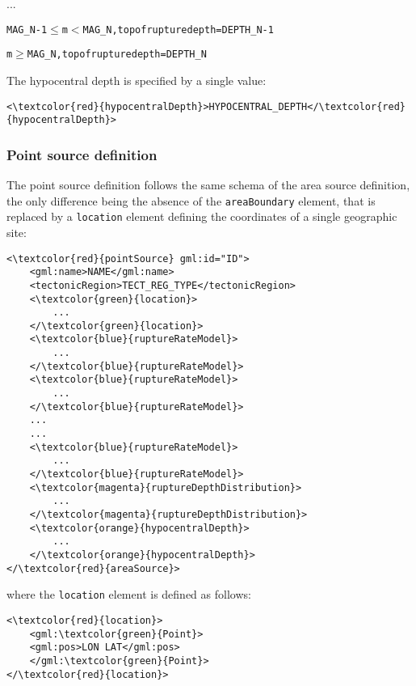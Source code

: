 		...
\begin{alltt}MAG_N-1 \(\leq\) m \(<\) MAG_N, top of rupture depth = DEPTH_N-1 \end{alltt}
\begin{alltt}m \(\geq\) MAG_N, top of rupture depth = DEPTH_N \end{alltt}
The hypocentral depth is specified by a single value:
\begin{Verbatim}[frame=single, commandchars=\\\{\},fontsize=\normalsize, samepage=true]
<\textcolor{red}{hypocentralDepth}>HYPOCENTRAL_DEPTH</\textcolor{red}{hypocentralDepth}>
\end{Verbatim}

\subsubsection{Point source definition}
The point source definition follows the same schema of the area source definition, the only
difference being the absence of the \Verb+areaBoundary+ element, that is replaced by a
\Verb+location+ element defining the coordinates of a single geographic site:
\begin{Verbatim}[frame=single, commandchars=\\\{\},fontsize=\normalsize, samepage=true]
<\textcolor{red}{pointSource} gml:id="ID">
	<gml:name>NAME</gml:name>
	<tectonicRegion>TECT_REG_TYPE</tectonicRegion>
	<\textcolor{green}{location}>
		...
	</\textcolor{green}{location}>
	<\textcolor{blue}{ruptureRateModel}>
		...
	</\textcolor{blue}{ruptureRateModel}>
	<\textcolor{blue}{ruptureRateModel}>
		...
	</\textcolor{blue}{ruptureRateModel}>
	...
	...
	<\textcolor{blue}{ruptureRateModel}>
		...
	</\textcolor{blue}{ruptureRateModel}>
	<\textcolor{magenta}{ruptureDepthDistribution}>
		...
	</\textcolor{magenta}{ruptureDepthDistribution}>
	<\textcolor{orange}{hypocentralDepth}>
		...	
	</\textcolor{orange}{hypocentralDepth}>
</\textcolor{red}{areaSource}>
\end{Verbatim}
where the \Verb+location+ element is defined as follows:
\begin{Verbatim}[frame=single, commandchars=\\\{\},fontsize=\normalsize, samepage=true]
<\textcolor{red}{location}>
	<gml:\textcolor{green}{Point}>
	<gml:pos>LON LAT</gml:pos>
	</gml:\textcolor{green}{Point}>
</\textcolor{red}{location}>
\end{Verbatim}

